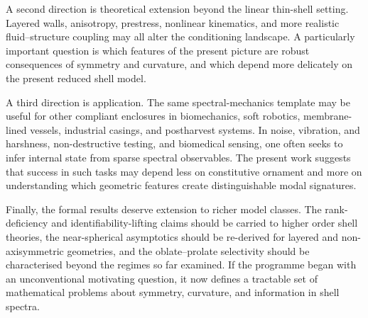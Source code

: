 A second direction is theoretical extension beyond the linear thin-shell
setting.  Layered walls, anisotropy, prestress, nonlinear kinematics, and more
realistic fluid--structure coupling may all alter the conditioning landscape.  A
particularly important question is which features of the present picture are
robust consequences of symmetry and curvature, and which depend more delicately
on the present reduced shell model.

A third direction is application.  The same spectral-mechanics template may be
useful for other compliant enclosures in biomechanics, soft robotics,
membrane-lined vessels, industrial casings, and postharvest systems.  In noise,
vibration, and harshness, non-destructive testing, and biomedical sensing, one
often seeks to infer internal state from sparse spectral observables.  The
present work suggests that success in such tasks may depend less on constitutive
ornament and more on understanding which geometric features create
distinguishable modal signatures.

Finally, the formal results deserve extension to richer model classes.  The
rank-deficiency and identifiability-lifting claims should be carried to higher
order shell theories, the near-spherical asymptotics should be re-derived for
layered and non-axisymmetric geometries, and the oblate--prolate selectivity
should be characterised beyond the regimes so far examined.  If the programme
began with an unconventional motivating question, it now defines a tractable set
of mathematical problems about
symmetry, curvature, and information in shell spectra.

